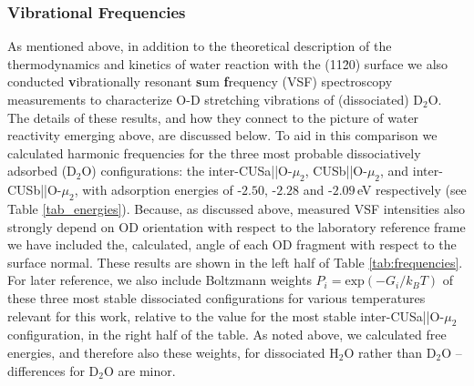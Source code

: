 \documentclass[twoside,twocolumn,9pt]{article}
\begin{document}
\subsubsection{Vibrational Frequencies}
As mentioned above, in addition to the theoretical description of the thermodynamics and kinetics of water reaction with the (11\=20) surface we also conducted \textbf{v}ibrationally resonant \textbf{s}um \textbf{f}requency (VSF) spectroscopy measurements to characterize O-D stretching vibrations of (dissociated) D$_2$O. The details of these results, and how they connect to the picture of water reactivity emerging above, are discussed below. To aid in this comparison we calculated harmonic frequencies for the three most probable dissociatively adsorbed (D$_2$O) configurations: the inter-CUSa||O-$\mu_2$, CUSb||O-$\mu_2$, and inter-CUSb||O-$\mu_2$, with adsorption energies of -$2.50$, -$2.28$ and -$2.09\,$eV respectively (see Table \ref{tab_energies}).  Because, as discussed above, measured VSF intensities also strongly depend on OD orientation with respect to the laboratory reference frame we have included the, calculated, angle of each OD fragment with respect to the surface normal. These results are shown in the left half of Table \ref{tab:frequencies}. For later reference, we also include Boltzmann weights $P_i = \text{exp}(-G_i/k_BT)$ of these three most stable dissociated configurations for various temperatures relevant for this work, relative to the value for the most stable inter-CUSa||O-$\mu_2$ configuration, in the right half of the table. As noted above, we calculated free energies, and therefore also these weights, for dissociated H$_2$O rather than D$_2$O -- differences for D$_2$O are minor.
%
\end{document}
